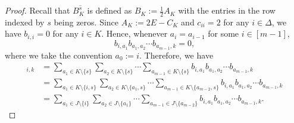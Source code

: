 \documentclass[10pt,a4paper]{amsart}
\begin{document}
\begin{proof}
    Recall that $B_K^{\widehat{s}}$ is defined as $B_K:=\frac{1}{2}A_K$ with the entries in the row indexed by $s$ being zeros. Since $A_K:=2E-C_K$ and $c_{ii}=2$ for any $i\in\Delta$, we have $b_{i,i}=0$ for any $i\in K$. Hence, whenever $a_{i}=a_{i-1}$ for some $i\in[m-1]$,  
    \[
    b_{i,a_1} b_{a_1,a_2} \cdots b_{a_{m-1},k} = 0,
    \]
    where we take the convention $a_0:=i$.
Therefore, we have
    \begin{align*}
        [(B_{K}^{\widehat{s}})^m]_{i,k}&=\sum_{a_1\in K\setminus\{s\}}\sum_{a_2\in K\setminus\{s\}}\cdots\sum_{a_{m-1}\in K\setminus\{s\}} b_{i,a_1}b_{a_1,a_2}\cdots b_{a_{m-1},k}\\
        &=\sum_{a_1\in K\setminus\{i,s\}}\sum_{a_2\in K\setminus\{a_1,s\}}\cdots\sum_{a_{m-1}\in K\setminus\{a_{m-2},s\}} b_{i,a_1}b_{a_1,a_2}\cdots b_{a_{m-1},k}\\
        &=\sum_{a_1\in J\setminus\{i\}}\sum_{a_2\in J\setminus\{a_1\}}\cdots\sum_{a_{m-1}\in J\setminus\{a_{m-2}\}}
b_{i,a_1}b_{a_1,a_2}\cdots b_{a_{m-1},k}.
    \end{align*}
\end{proof}
\end{document}
